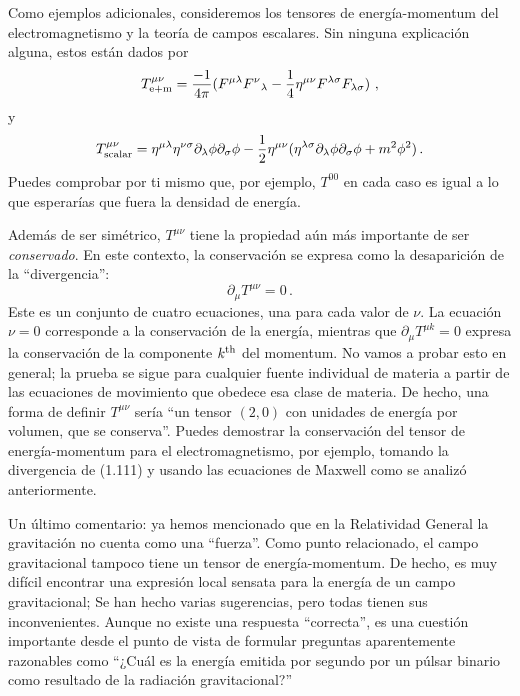 \documentclass[11pt,b5paper,openany,twoside]{book}
\newcommand{\mn}{{\mu\nu}}
\newcommand{\p}[1]{{\partial_{#1}}}
\begin{document}
Como ejemplos adicionales, consideremos los tensores de energía-momentum del electromagnetismo y la teoría de campos escalares.
Sin ninguna explicación alguna, estos están dados por
\begin{equation}
T^\mn_{\rm e+m} = {-1\over{4\pi}}(F^{\mu\lambda}F^\nu{}_\lambda
-{1\over 4}\eta^{\mu\nu} F^{\lambda\sigma}F_{\lambda\sigma})
\ ,\label{1.111}
\end{equation}
y
\begin{equation}
T^\mn_{\rm scalar} = \eta^{\mu\lambda}\eta^{\nu\sigma}
\p\lambda\phi\p\sigma\phi - {1\over 2}\eta^\mn (\eta^{\lambda\sigma}
\p\lambda\phi\p\sigma\phi + m^2\phi^2)\,.\label{1.112}
\end{equation}
Puedes comprobar por ti mismo que, por ejemplo, $T^{00}$ en cada caso es igual a lo que esperarías que fuera la densidad de energía.

Además de ser simétrico, $T^\mn$ tiene la propiedad aún más importante de ser {\it conservado}.
En este contexto, la conservación se expresa como la desaparición de la ``divergencia'':
\begin{equation}
\p\mu T^\mn =0\,.\label{1.113}
\end{equation}
Este es un conjunto de cuatro ecuaciones, una para cada valor de $\nu$.
La ecuación $\nu =0$ corresponde a la conservación de la energía, mientras que $\p\mu T^{\mu k}=0$ expresa la conservación de la componente $k^{\rm th}$ del momentum.
No vamos a probar esto en general; la prueba se sigue para cualquier fuente individual de materia a partir de las ecuaciones de movimiento que obedece esa clase de materia.
De hecho, una forma de definir $T^\mn$ sería ``un tensor $(2,0)$ con unidades de energía por volumen, que se conserva''. Puedes demostrar la conservación del tensor de energía-momentum para el electromagnetismo, por ejemplo, tomando la divergencia de (1.111) y usando las ecuaciones de Maxwell como se analizó anteriormente.

Un último comentario: ya hemos mencionado que en la Relatividad General la gravitación no cuenta como una ``fuerza''. Como punto relacionado, el campo gravitacional tampoco tiene un tensor de energía-momentum.
De hecho, es muy difícil encontrar una expresión local sensata para la energía de un campo gravitacional; Se han hecho varias sugerencias, pero todas tienen sus inconvenientes.
Aunque no existe una respuesta ``correcta'', es una cuestión importante desde el punto de vista de formular preguntas aparentemente razonables como ``¿Cuál es la energía emitida por segundo por un púlsar binario como resultado de la radiación gravitacional?''
\end{document}
